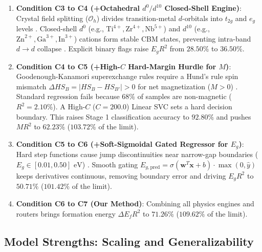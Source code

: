 \documentclass[12pt,onecolumn]{elsarticle}
\begin{document}
\begin{enumerate}
\item \textbf{Condition C3 to C4 (+Octahedral $d^0/d^{10}$ Closed-Shell Engine)}: Crystal field splitting ($\mathcal{O}_h$) divides transition-metal $d$-orbitals into $t_{2g}$ and $e_g$ levels \cite{goodenough1971magnetism}. Closed-shell $d^0$ (e.g., $\text{Ti}^{4+}, \text{Zr}^{4+}, \text{Nb}^{5+}$) and $d^{10}$ (e.g., $\text{Zn}^{2+}, \text{Ga}^{3+}, \text{In}^{3+}$) cations form stable CBM states, preventing intra-band $d \to d$ collapse \cite{walsh2011design}. Explicit binary flags raise $E_g R^2$ from $28.50\%$ to \textbf{$36.50\%$}.

\item \textbf{Condition C4 to C5 (+High-$C$ Hard-Margin Hurdle for $M$)}: Goodenough-Kanamori superexchange rules require a Hund's rule spin mismatch $\Delta HS_B = |HS_B - HS_{B'}| > 0$ for net magnetization ($M > 0$) \cite{goodenough1955theory, kanamori1959superexchange}. Standard regression fails because $68\%$ of samples are non-magnetic ($R^2 = 2.10\%$). A High-$C$ ($C=200.0$) Linear SVC sets a hard decision boundary. This raises Stage 1 classification accuracy to $92.80\%$ and pushes $M R^2$ to \textbf{$62.23\%$} ($103.72\%$ of the limit).

\item \textbf{Condition C5 to C6 (+Soft-Sigmoidal Gated Regressor for $E_g$)}: Hard step functions cause jump discontinuities near narrow-gap boundaries ($E_g \in [0.01, 0.50]\text{ eV}$) \cite{borlido2019large}. Smooth gating $E_{g, \text{pred}} = \sigma(\mathbf{w}^T \mathbf{x} + b) \cdot \max(0, \hat{y})$ keeps derivatives continuous, removing boundary error and driving $E_g R^2$ to \textbf{$50.71\%$} ($101.42\%$ of the limit).

\item \textbf{Condition C6 to C7 (Our Method)}: Combining all physics engines and routers brings formation energy $\Delta E_f R^2$ to \textbf{$71.26\%$} ($109.62\%$ of the limit).
\end{enumerate}

\subsection{Model Strengths: Scaling and Generalizability}
\end{document}
